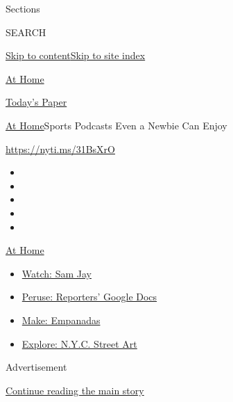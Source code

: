 Sections

SEARCH

\protect\hyperlink{site-content}{Skip to
content}\protect\hyperlink{site-index}{Skip to site index}

\href{https://www.nytimes.com/spotlight/at-home}{At Home}

\href{https://myaccount.nytimes.com/auth/login?response_type=cookie\&client_id=vi}{}

\href{https://www.nytimes.com/section/todayspaper}{Today's Paper}

\href{/spotlight/at-home}{At Home}\textbar{}Sports Podcasts Even a
Newbie Can Enjoy

\href{https://nyti.ms/31BsXrO}{https://nyti.ms/31BsXrO}

\begin{itemize}
\item
\item
\item
\item
\item
\end{itemize}

\href{https://www.nytimes.com/spotlight/at-home?action=click\&pgtype=Article\&state=default\&region=TOP_BANNER\&context=at_home_menu}{At
Home}

\begin{itemize}
\tightlist
\item
  \href{https://www.nytimes.com/2020/08/04/arts/television/sam-jay-netflix-special.html?action=click\&pgtype=Article\&state=default\&region=TOP_BANNER\&context=at_home_menu}{Watch:
  Sam Jay}
\item
  \href{https://www.nytimes.com/interactive/2020/at-home/even-more-reporters-editors-diaries-lists-recommendations.html?action=click\&pgtype=Article\&state=default\&region=TOP_BANNER\&context=at_home_menu}{Peruse:
  Reporters' Google Docs}
\item
  \href{https://www.nytimes.com/2020/08/04/dining/colombian-empanadas-carlos-gaviria.html?action=click\&pgtype=Article\&state=default\&region=TOP_BANNER\&context=at_home_menu}{Make:
  Empanadas}
\item
  \href{https://www.nytimes.com/2020/08/06/arts/design/street-art-nyc-george-floyd.html?action=click\&pgtype=Article\&state=default\&region=TOP_BANNER\&context=at_home_menu}{Explore:
  N.Y.C. Street Art}
\end{itemize}

Advertisement

\protect\hyperlink{after-top}{Continue reading the main story}

